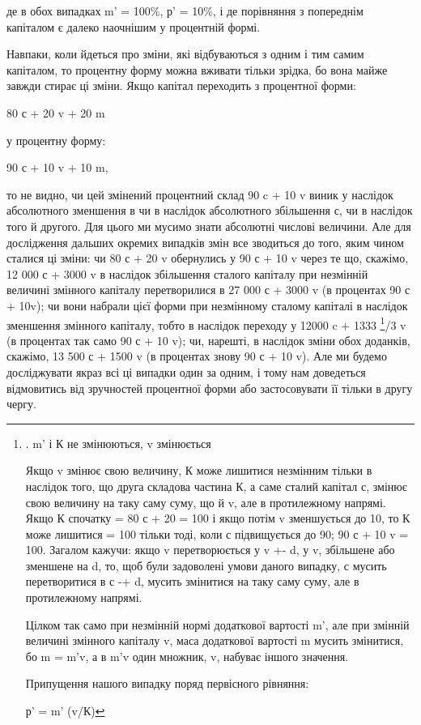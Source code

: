 \parcont{}  %
де в обох випадках m' = 100\%, р' = 10\%, і де порівняння з попереднім
капіталом є далеко наочнішим у процентній формі.

Навпаки, коли йдеться про зміни, які відбуваються з одним
і тим самим капіталом, то процентну форму можна вживати
тільки зрідка, бо вона майже завжди стирає ці зміни. Якщо
капітал переходить з процентної форми:

80 с + 20 v + 20 m

у процентну форму:

90 с + 10 v + 10 m,

то не видно, чи цей змінений процентний склад 90 c + 10 v виник
у наслідок абсолютного зменшення в чи в наслідок абсолютного
збільшення с, чи в наслідок того й другого. Для цього ми мусимо
знати абсолютні числові величини. Але для дослідження
дальших окремих випадків змін все зводиться до того, яким
чином сталися ці зміни: чи 80 с + 20 v обернулись у 90 с + 10 v
через те що, скажімо, 12 000 с + 3000 v в наслідок збільшення
сталого капіталу при незмінній величині змінного капіталу перетворилися
в 27 000 с + 3000 v (в процентах 90 с + 10v); чи вони
набрали цієї форми при незмінному сталому капіталі в наслідок
зменшення змінного капіталу, тобто в наслідок переходу у
12000 c + 1333 \footnote{
. m' і К не змінюються, v змінюється

Якщо v змінює свою величину, К може лишитися незмінним
тільки в наслідок того, що друга складова частина К, а саме
сталий капітал с, змінює свою величину на таку саму суму, що й v,
але в протилежному напрямі. Якщо К спочатку = 80 с + 20 = 100
і якщо потім v зменшується до 10, то К може лишитися = 100
тільки тоді, коли с підвищується до 90; 90 с + 10 v = 100. Загалом
кажучи: якщо v перетворюється у v +- d, у v, збільшене або
зменшене на d, то, щоб були задоволені умови даного випадку,
с мусить перетворитися в с -+ d, мусить змінитися на таку саму
суму, але в протилежному напрямі.

Цілком так само при незмінній нормі додаткової вартості m',
але при змінній величині змінного капіталу v, маса додаткової
вартості m мусить змінитися, бо m = m'v, а в m'v один множник,
v, набуває іншого значення.

Припущення нашого випадку поряд первісного рівняння:

р' = m' (v/К)
}/3 v (в процентах так само 90 с + 10 v); чи, нарешті,
в наслідок зміни обох доданків, скажімо, 13 500 с + 1500 v
(в процентах знову 90 с + 10 v). Але ми будемо досліджувати
якраз всі ці випадки один за одним, і тому нам доведеться
відмовитись від зручностей процентної форми або застосовувати
її тільки в другу чергу.
\parbreak{}  %
